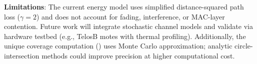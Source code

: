 \textbf{Limitations}: The current energy model uses simplified distance-squared path loss ($\gamma=2$) and does not account for fading, interference, or MAC-layer contention. Future work will integrate stochastic channel models and validate via hardware testbed (e.g., TelosB motes with thermal profiling). Additionally, the unique coverage computation () uses Monte Carlo approximation; analytic circle-intersection methods could improve precision at higher computational cost.
